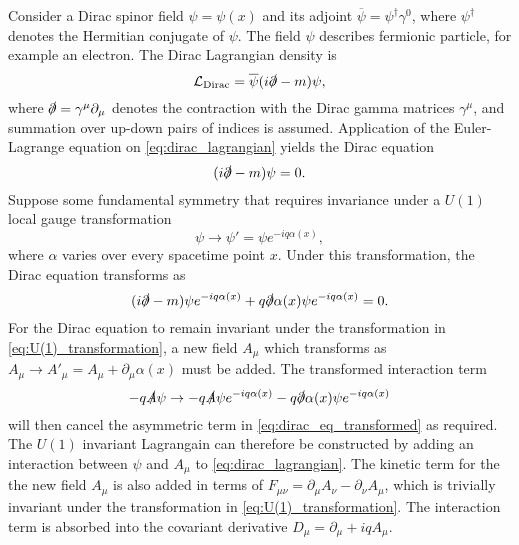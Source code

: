Consider a Dirac spinor field $\psi = \psi(x)$ and its adjoint $\overline{\psi} = \psi^\dagger \gamma^0$, where $\psi^\dagger$ denotes the Hermitian conjugate of $\psi$.
The field $\psi$ describes fermionic \spinhalf particle, for example an electron.
The Dirac Lagrangian density is
%
\begin{equation}\label{eq:dirac_lagrangian}
  \mathcal{L}_{\textnormal{Dirac}} = \overline{\psi} (i \slashed{\partial}  - m )\psi,
\end{equation}
%
where $\slashed{\partial} = \gamma^\mu \partial_\mu$ denotes the contraction with the Dirac gamma matrices $\gamma^\mu$, and summation over up-down pairs of indices is assumed.
Application of the Euler-Lagrange equation on \cref{eq:dirac_lagrangian} yields the Dirac equation
%
\begin{equation}\label{eq:dirac_eq}
  (i \slashed{\partial}  - m )\psi = 0.
\end{equation}
%
Suppose some fundamental symmetry that requires invariance under a $U(1)$ local gauge transformation
%
\begin{equation}\label{eq:U(1)_transformation}
  \psi \rightarrow \psi' = \psi e^{- i q \alpha(x)} ,
\end{equation}
%
where $\alpha$ varies over every spacetime point $x$.
Under this transformation, the Dirac equation transforms as 
%
\begin{equation}\label{eq:dirac_eq_transformed}
  (i \slashed{\partial} - m ) \psi e^{- i q \alpha(x)} + q \slashed{\partial}\alpha(x) \psi e^{- i q \alpha(x)} = 0.
\end{equation}
%
For the Dirac equation to remain invariant under the transformation in \cref{eq:U(1)_transformation}, a new field $A_\mu$ which transforms as $A_\mu \rightarrow A'_\mu = A_\mu + \partial_\mu \alpha(x)$ must be added.
The transformed interaction term
%
\begin{equation}
  - q \slashed{A} \psi \rightarrow - q \slashed{A} \psi e^{- i q \alpha(x)} - q \slashed{\partial} \alpha(x) \psi e^{- i q \alpha(x)}
\end{equation}
%
will then cancel the asymmetric term in \cref{eq:dirac_eq_transformed} as required.
The $U(1)$ invariant Lagrangain can therefore be constructed by adding an interaction between $\psi$ and $A_\mu$ to \cref{eq:dirac_lagrangian}. The kinetic term for the the new field $A_\mu$ is also added in terms of $F_{\mu\nu} = \partial_\mu A_\nu - \partial_\nu A_\mu$, which is trivially invariant under the transformation in \cref{eq:U(1)_transformation}.
The interaction term is absorbed into the covariant derivative $D_\mu = \partial_\mu + i q A_\mu$.
